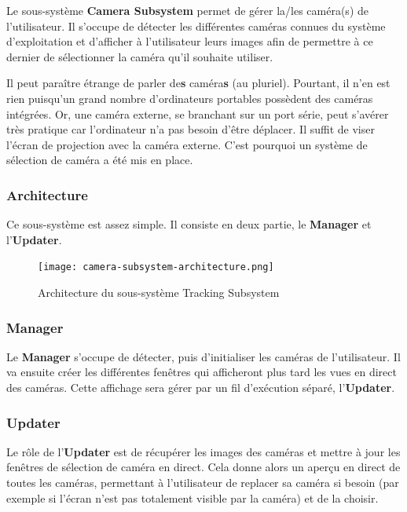 \documentclass[11pt,a4paper,oldfontcommands]{memoir}
\begin{document}
Le sous-système \textbf{Camera Subsystem} permet de gérer la/les caméra(s) de l'utilisateur. Il s'occupe de détecter les différentes caméras connues du système d'exploitation et d'afficher à l'utilisateur leurs images afin de permettre à ce dernier de sélectionner la caméra qu'il souhaite utiliser.

Il peut paraître étrange de parler de\textbf{s} caméra\textbf{s} (au pluriel). Pourtant, il n'en est rien puisqu'un grand nombre d'ordinateurs portables possèdent des caméras intégrées. Or, une caméra externe, se branchant sur un port série, peut s'avérer très pratique car l'ordinateur n'a pas besoin d'être déplacer. Il suffit de viser l'écran de projection avec la caméra externe. C'est pourquoi un système de sélection de caméra a été mis en place.

\subsubsection{Architecture}

Ce sous-système est assez simple. Il consiste en deux partie, le \textbf{Manager} et l'\textbf{Updater}.

\begin{figure}[H]
\centering
\texttt{[image: camera-subsystem-architecture.png]}
\caption{Architecture du sous-système Tracking Subsystem}
\end{figure}

\subsubsection{Manager}

Le \textbf{Manager} s'occupe de détecter, puis d'initialiser les caméras de l'utilisateur. Il va ensuite créer les différentes fenêtres qui afficheront plus tard les vues en direct des caméras. Cette affichage sera gérer par un fil d'exécution séparé, l'\textbf{Updater}.

\subsubsection{Updater}

Le rôle de l'\textbf{Updater} est de récupérer les images des caméras et mettre à jour les fenêtres de sélection de caméra en direct. Cela donne alors un aperçu en direct de toutes les caméras, permettant à l'utilisateur de replacer sa caméra si besoin (par exemple si l'écran n'est pas totalement visible par la caméra) et de la choisir.
\end{document}

